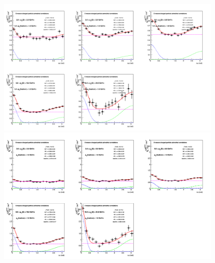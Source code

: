 \begin{figure}[h]
\centering
{\includegraphics[width=0.99\linewidth, height=0.70\linewidth]{figures/Fits/cFitting_0_pthad1dot0to2dot0.png}}
{\includegraphics[width=0.99\linewidth, height=0.70\linewidth]{figures/Fits/cFitting_0_pthad1dot0to99dot.png}}
\end{figure}
